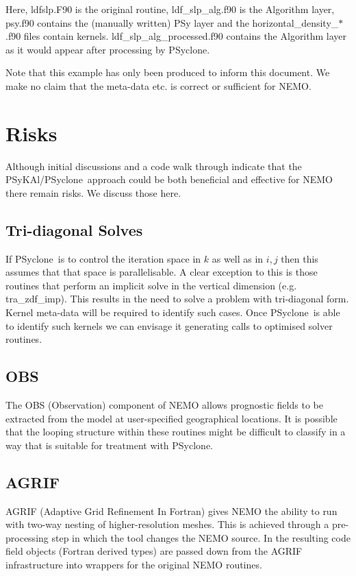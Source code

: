 \documentclass{article}
\newcommand{\psykal}{{PS}y{KA}l}
\newcommand{\psyclone}{{PS}yclone}
\begin{document}
Here, ldfslp.F90 is the original routine, ldf\_slp\_alg.f90 is the
Algorithm layer, psy.f90 contains the (manually written) PSy layer and
the horizontal\_density\_$\ast$.f90 files contain kernels.
ldf\_slp\_alg\_processed.f90 contains the Algorithm layer as it would
appear after processing by \psyclone.

Note that this example has only been produced to inform this
document. We make no claim that the meta-data etc. is correct or
sufficient for NEMO.
 
\section{Risks}

Although initial discussions and a code walk through indicate that the
\psykal/\psyclone\ approach could be both beneficial and effective for
NEMO there remain risks. We discuss those here.

\subsection{Tri-diagonal Solves}

If \psyclone\ is to control the iteration space in $k$ as well as in $i,
j$ then this assumes that that space is parallelisable. A clear
exception to this is those routines that perform an implicit solve in
the vertical dimension (e.g. tra\_zdf\_imp). This results in the need
to solve a problem with tri-diagonal form. Kernel meta-data will be
required to identify such cases. Once \psyclone\ is able to identify
such kernels we can envisage it generating calls to optimised solver
routines.

\subsection{OBS}

The OBS (Observation) component of NEMO allows prognostic fields to be
extracted from the model at user-specified geographical locations.  It
is possible that the looping structure within these routines might be
difficult to classify in a way that is suitable for treatment with
\psyclone.

\subsection{AGRIF}

AGRIF (Adaptive Grid Refinement In Fortran) gives NEMO the ability to
run with two-way nesting of higher-resolution meshes. This is achieved
through a pre-processing step in which the tool changes the NEMO
source. In the resulting code field objects (Fortran derived types)
are passed down from the AGRIF infrastructure into wrappers for the
original NEMO routines.
\end{document}
